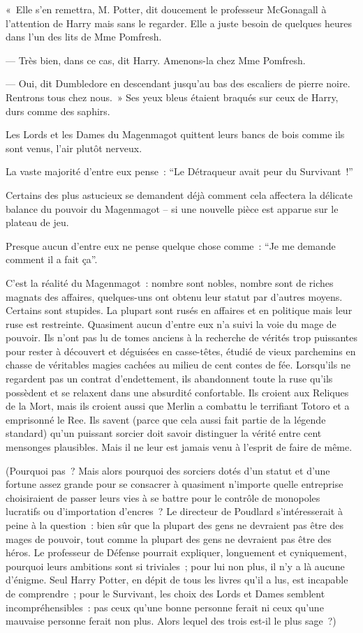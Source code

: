 «~Elle s'en remettra, M. Potter, dit doucement le professeur McGonagall à l'attention de Harry mais sans le regarder.
Elle a juste besoin de quelques heures dans l'un des lits de Mme Pomfresh.

--- Très bien, dans ce cas, dit Harry.
Amenons-la chez Mme Pomfresh.

--- Oui, dit Dumbledore en descendant jusqu'au bas des escaliers de pierre noire.
Rentrons tous chez nous.~»
Ses yeux bleus étaient braqués sur ceux de Harry, durs comme des saphirs.

\later

Les Lords et les Dames du Magenmagot quittent leurs bancs de bois comme ils sont venus, l'air plutôt nerveux.

La vaste majorité d'entre eux pense~: “Le Détraqueur avait peur du Survivant~!”

Certains des plus astucieux se demandent déjà comment cela affectera la délicate balance du pouvoir du Magenmagot -- si une nouvelle pièce est apparue sur le plateau de jeu.

Presque aucun d'entre eux ne pense quelque chose comme~: “Je me demande comment il a fait ça”.

C'est la réalité du Magenmagot~: nombre sont nobles, nombre sont de riches magnats des affaires, quelques-uns ont obtenu leur statut par d'autres moyens.
Certains sont stupides.
La plupart sont rusés en affaires et en politique mais leur ruse est restreinte.
Quasiment aucun d'entre eux n'a suivi la voie du mage de pouvoir.
Ils n'ont pas lu de tomes anciens à la recherche de vérités trop puissantes pour rester à découvert et déguisées en casse-têtes, étudié de vieux parchemins en chasse de véritables magies cachées au milieu de cent contes de fée.
Lorsqu'ils ne regardent pas un contrat d'endettement, ils abandonnent toute la ruse qu'ils possèdent et se relaxent dans une absurdité confortable.
Ils croient aux Reliques de la Mort, mais ils croient aussi que Merlin a combattu le terrifiant Totoro et a emprisonné le Ree.
Ils savent (parce que cela aussi fait partie de la légende standard) qu'un puissant sorcier doit savoir distinguer la vérité entre cent mensonges plausibles.
Mais il ne leur est jamais venu à l'esprit de faire de même.

(Pourquoi pas~?
Mais alors pourquoi des sorciers dotés d'un statut et d'une fortune assez grande pour se consacrer à quasiment n'importe quelle entreprise choisiraient de passer leurs vies à se battre pour le contrôle de monopoles lucratifs ou d'importation d'encres~?
Le directeur de Poudlard s'intéresserait à peine à la question~: bien sûr que la plupart des gens ne devraient pas être des mages de pouvoir, tout comme la plupart des gens ne devraient pas être des héros.
Le professeur de Défense pourrait expliquer, longuement et cyniquement, pourquoi leurs ambitions sont si triviales~; pour lui non plus, il n'y a là aucune d'énigme.
Seul Harry Potter, en dépit de tous les livres qu'il a lus, est incapable de comprendre~; pour le Survivant, les choix des Lords et Dames semblent incompréhensibles~: pas ceux qu'une bonne personne ferait ni ceux qu'une mauvaise personne ferait non plus.
Alors lequel des trois est-il le plus sage~?)

